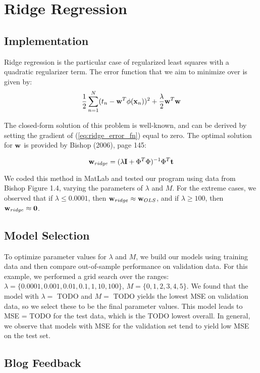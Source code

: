 
\section{Ridge Regression}\label{sec:ridge_reg}

\subsection{Implementation}
Ridge regression is the particular case of regularized least squares with a quadratic regularizer term.  The error function that we aim to minimize over is given by:
\begin{equation} \label{eq:ridge_error_fn}
\frac{1}{2} \sum_{n=1}^{N} (t_n - \boldsymbol{\mathbf{w}}^T \phi (\boldsymbol{\mathbf{x}}_n) )^2 + \frac{\lambda}{2} \boldsymbol{\mathbf{w}}^T \boldsymbol{\mathbf{w}}
\end{equation}

The closed-form solution of this problem is well-known, and can be derived by setting the gradient of (\ref{eq:ridge_error_fn}) equal to zero.  The optimal solution for $\boldsymbol{\mathbf{w}}$ is provided by Bishop (2006), page 145:

\begin{equation} \label{eq:ridge_sol}
\boldsymbol{\mathbf{w}}_{ridge} = (\lambda \boldsymbol{\mathbf{I}} + \Phi^T \Phi)^{-1} \Phi^T \boldsymbol{\mathbf{t}}
\end{equation}

We coded this method in MatLab and tested our program using data from Bishop Figure 1.4, varying the parameters of $\lambda$ and $M$.  For the extreme cases, we observed that if $\lambda \leq 0.0001$, then $\boldsymbol{\mathbf{w}}_{ridge} \approx \boldsymbol{\mathbf{w}}_{OLS}$, and if $\lambda \geq 100$, then $\boldsymbol{\mathbf{w}}_{ridge} \approx \boldsymbol{\mathbf{0}}$.



\subsection{Model Selection}
To optimize parameter values for $\lambda$ and $M$, we build our models using training data and then compare out-of-sample performance on validation data.  For this example, we performed a grid search over the ranges: $\lambda = \{0.0001, 0.001, 0.01, 0.1,1,10,100\}$, $M = \{0,1,2,3,4,5\}$.  We found that the model with $\lambda = $ TODO and $M = $ TODO yields the lowest MSE on validation data, so we select these to be the final parameter values.  This model leads to MSE = TODO for the test data, which is the TODO lowest overall.  In general, we observe that models with MSE for the validation set tend to yield low MSE on the test set.  


\subsection{Blog Feedback}